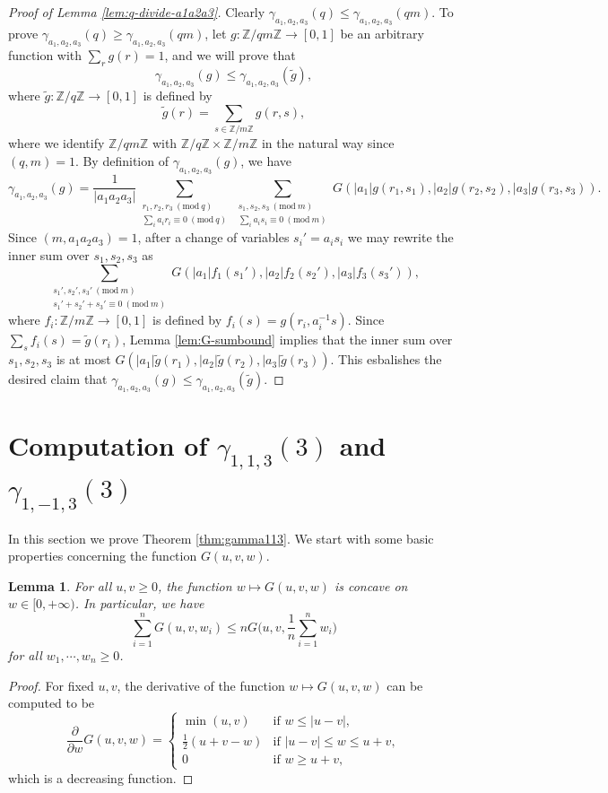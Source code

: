 \documentclass[12pt, notitlepage]{amsart}
\numberwithin{equation}{section}
\def\Z{\mathbb Z}
\def\wt{\widetilde}
\newcommand{\Mod}[1]{\ (\mathrm{mod}\ #1)}
\newtheorem{lemma}[theorem]{Lemma}
\theoremstyle{remark}
\theoremstyle{definition}
\theoremstyle{remark}
\numberwithin{equation}{section}
\begin{document}
\begin{proof}[Proof of Lemma \ref{lem:q-divide-a1a2a3}]
Clearly $\gamma_{a_1,a_2,a_3}(q) \leq \gamma_{a_1,a_2,a_3}(qm)$. To prove $\gamma_{a_1,a_2,a_3}(q) \geq \gamma_{a_1,a_2,a_3}(qm)$, let $g: \Z/qm\Z \rightarrow [0,1]$ be an arbitrary function with $\sum_r g(r) = 1$, and we will prove that
$$
\gamma_{a_1,a_2,a_3}(g) \leq \gamma_{a_1,a_2,a_3}(\wt{g}),
$$
where $\wt{g}: \Z/q\Z \rightarrow [0,1]$ is defined by
$$
\wt{g}(r) = \sum_{s \in \Z/m\Z} g(r,s),
$$
where we identify $\Z/qm\Z$ with $\Z/q\Z \times \Z/m\Z$ in the natural way since $(q,m)=1$. By definition of $\gamma_{a_1,a_2,a_3}(g)$, we have
$$
\gamma_{a_1,a_2,a_3}(g) = \frac{1}{|a_1a_2a_3|} \sum_{\substack{r_1,r_2,r_3\Mod{q} \\ \sum_i a_ir_i\equiv 0\Mod{q}}} \sum_{\substack{s_1,s_2,s_3\Mod{m} \\ \sum_ia_is_i\equiv 0\Mod{m}}} G(|a_1|g(r_1,s_1), |a_2|g(r_2,s_2), |a_3|g(r_3,s_3)).
$$
Since $(m,a_1a_2a_3)=1$, after a change of variables $s_i'=a_is_i$ we may rewrite the inner sum over $s_1,s_2,s_3$ as
$$
\sum_{\substack{s_1',s_2',s_3'\Mod{m} \\ s_1'+s_2'+s_3'\equiv 0\Mod{m} }} G(|a_1|f_1(s_1'), |a_2|f_2(s_2'), |a_3|f_3(s_3')),
$$
where $f_i: \Z/m\Z \rightarrow [0,1]$ is defined by $f_i(s) = g(r_i, a_i^{-1}s)$. Since $\sum_{s} f_i(s) = \wt{g}(r_i)$, Lemma \ref{lem:G-sumbound} implies that the inner sum over $s_1,s_2,s_3$ is at most $G(|a_1|\wt{g}(r_1), |a_2|\wt{g}(r_2), |a_3|\wt{g}(r_3))$. This esbalishes the desired claim that $\gamma_{a_1,a_2,a_3}(g) \leq \gamma_{a_1,a_2,a_3}(\wt{g})$.
\end{proof}

\section{Computation of $\gamma_{1,1,3}(3)$ and $\gamma_{1,-1,3}(3)$}\label{sec:47/122}

In this section we prove Theorem \ref{thm:gamma113}. We start with some basic properties concerning the function $G(u,v,w)$.

\begin{lemma}\label{lem:G-convexity}
For all $u,v \geq 0$, the function $w\mapsto G(u,v,w)$ is concave on $w \in [0,+\infty)$. In particular, we have
$$
\sum_{i=1}^n G(u,v,w_i) \leq n G\Big(u,v,\frac{1}{n}\sum_{i=1}^nw_i\Big)
$$
for all $w_1,\cdots,w_n \geq 0$.
\end{lemma}

\begin{proof}
For fixed $u,v$, the derivative of the function $w\mapsto G(u,v,w)$ can be computed to be
$$
\frac{\partial}{\partial w} G(u,v,w) = \begin{cases} \min(u,v) & \text{if }w \leq |u-v|, \\ \frac{1}{2}(u+v-w) & \text{if } |u-v| \leq w \leq u+v, \\ 0 & \text{if }w \geq u+v, \end{cases}
$$
which is a decreasing function.
\end{proof}
\end{document}
